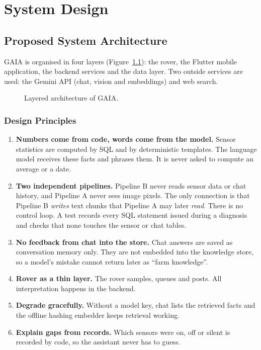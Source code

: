 \chapter{System Design}

\section{Proposed System Architecture}

GAIA is organised in four layers (Figure~\ref{fig:architecture}): the rover, the Flutter mobile application, the backend
services and the data layer. Two outside services are used: the Gemini API (chat, vision and embeddings) and web search.

\begin{figure}[H]
\centering

\caption{Layered architecture of GAIA.}
\label{fig:architecture}
\end{figure}

\subsection{Design Principles}

\begin{enumerate}
\item \textbf{Numbers come from code, words come from the model.} Sensor statistics are computed by SQL and by deterministic
      templates. The language model receives these facts and phrases them. It is never asked to compute an average or a date.
\item \textbf{Two independent pipelines.} Pipeline B never reads sensor data or chat history, and Pipeline A never sees image pixels.
      The only connection is that Pipeline B \emph{writes} text chunks that Pipeline A may later \emph{read}. There is no control loop.
      A test records every SQL statement issued during a diagnosis and checks that none touches the sensor or chat tables.
\item \textbf{No feedback from chat into the store.} Chat answers are saved as conversation memory only. They are not embedded into the
      knowledge store, so a model's mistake cannot return later as ``farm knowledge''.
\item \textbf{Rover as a thin layer.} The rover samples, queues and posts. All interpretation happens in the backend.
\item \textbf{Degrade gracefully.} Without a model key, chat lists the retrieved facts and the offline hashing embedder keeps retrieval working.
\item \textbf{Explain gaps from records.} Which sensors were on, off or silent is recorded by code, so the assistant never has to guess.
\end{enumerate}

